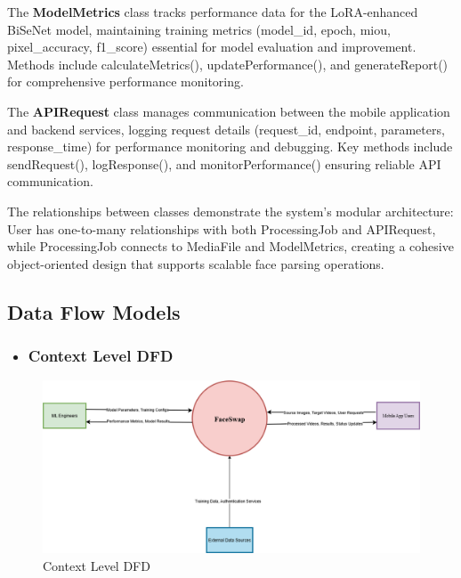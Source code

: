 \documentclass[12pt,a4paper]{report}
\begin{document}
The \textbf{ModelMetrics} class tracks performance data for the LoRA-enhanced BiSeNet model, maintaining training metrics (model\_id, epoch, miou, pixel\_accuracy, f1\_score) essential for model evaluation and improvement. Methods include calculateMetrics(), updatePerformance(), and generateReport() for comprehensive performance monitoring.

The \textbf{APIRequest} class manages communication between the mobile application and backend services, logging request details (request\_id, endpoint, parameters, response\_time) for performance monitoring and debugging. Key methods include sendRequest(), logResponse(), and monitorPerformance() ensuring reliable API communication.

The relationships between classes demonstrate the system's modular architecture: User has one-to-many relationships with both ProcessingJob and APIRequest, while ProcessingJob connects to MediaFile and ModelMetrics, creating a cohesive object-oriented design that supports scalable face parsing operations.

\begin{landscape}
\subsection{Data Flow Models}
\begin{itemize}
    \item \subsubsection{Context Level DFD}
\end{itemize}

\begin{figure}[H]

\centering
\includegraphics[width=1.5\textwidth]{figures/context_level_dfd.png}
\caption{Context Level DFD}
\label{fig:context_dfd}
\end{figure}
\end{landscape}
\end{document}
